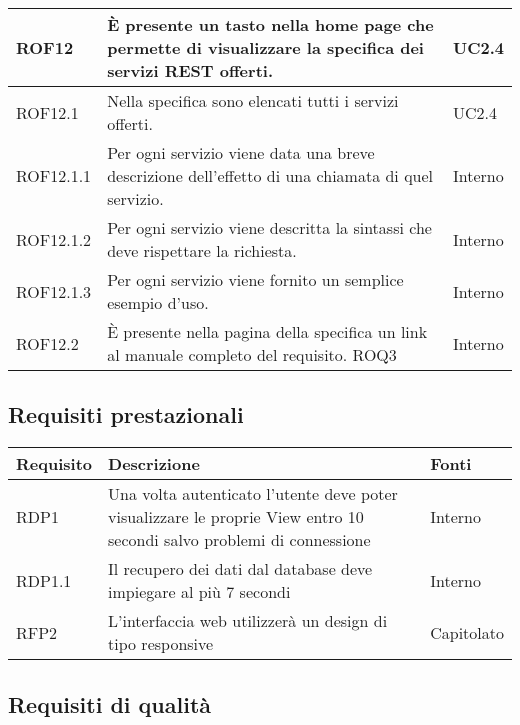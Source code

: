 \begin{center}
\begin{longtable}{| p{2.5cm} | p{8cm} | p{2cm} |}
		ROF12 & È presente un tasto nella home page che permette di visualizzare la specifica dei servizi REST offerti. &  UC2.4  \\
		\hline
		ROF12.1 & Nella specifica sono elencati tutti i servizi offerti. &  UC2.4  \\
		\hline
		ROF12.1.1 & Per ogni servizio viene data una breve descrizione dell'effetto di una chiamata di quel servizio. & Interno \\
		\hline
		ROF12.1.2 & Per ogni servizio viene descritta la sintassi che deve rispettare la richiesta. & Interno \\
		\hline
		ROF12.1.3 & Per ogni servizio viene fornito un semplice esempio d'uso. & Interno \\
		\hline
		ROF12.2 & È presente nella pagina della specifica un link al manuale completo del requisito. ROQ3 & Interno \\
		\hline

	\end{longtable}
	\egroup
\end{center}


\subsection{Requisiti prestazionali}

\begin{center}

	\def\arraystretch{1.5}
	\bgroup
	\begin{longtable}{| p{2.5cm} | p{8cm} | p{2cm} |}

		\hline
		\textbf{Requisito} & \textbf{Descrizione} & \textbf{Fonti} \\
		\hline

		RDP1  &  Una volta autenticato l'utente deve poter visualizzare le proprie View entro 10 secondi salvo problemi di connessione &  Interno \\
		\hline
		RDP1.1  &  Il recupero dei dati dal database deve impiegare al più 7 secondi  &  Interno \\
		\hline
		RFP2  &  L'interfaccia web utilizzerà un design di tipo responsive  &  Capitolato \\
		\hline

	\end{longtable}
	\egroup
\end{center}

\subsection{Requisiti di qualità}

